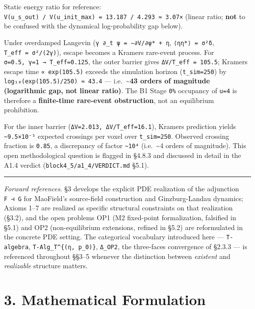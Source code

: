 \documentclass[
]{article}
\begin{document}
Static energy ratio for reference:
\texttt{V(u\_s\_out)\ /\ V(u\_init\_max)\ =\ 13.187\ /\ 4.293\ ≈\ 3.07×}
(linear ratio; \textbf{not} to be confused with the dynamical
log-probability gap below).

Under overdamped Langevin (\texttt{γ\ ∂\_t\ ψ\ =\ −∂V/∂ψ*\ +\ η},
\texttt{⟨ηη*⟩\ =\ σ²δ}, \texttt{T\_eff\ =\ σ²/(2γ)}), escape becomes a
Kramers rare-event process. For \texttt{σ=0.5,\ γ=1\ →\ T\_eff=0.125},
the outer barrier gives \texttt{ΔV/T\_eff\ =\ 105.5}; Kramers escape
time \texttt{∝\ exp(105.5)} exceeds the simulation horizon
(\texttt{t\_sim=250}) by \texttt{log₁₀(exp(105.5)/250)\ ≈\ 43.4} ---
i.e.~\textbf{\textasciitilde43 orders of magnitude (logarithmic gap, not
linear ratio)}. The B1 Stage \texttt{0\%} occupancy of \texttt{u=4} is
therefore a \textbf{finite-time rare-event obstruction}, not an
equilibrium prohibition.

For the inner barrier (\texttt{ΔV=2.013,\ ΔV/T\_eff=16.1}), Kramers
prediction yields \texttt{\textasciitilde{}9.5×10⁻⁵} expected crossings
per voxel over \texttt{t\_sim=250}. Observed crossing fraction is
\texttt{0.85}, a discrepancy of factor \texttt{\textasciitilde{}10⁴}
(i.e.~\textasciitilde4 orders of magnitude). This open methodological
question is flagged in §4.8.3 and discussed in detail in the A1.4
verdict (\texttt{block4\_5/a1\_4/VERDICT.md} §5.1).

\begin{center}\rule{0.5\linewidth}{0.5pt}\end{center}

\emph{Forward references}. §3 develops the explicit PDE realization of
the adjunction \texttt{F\ ⊣\ G} for MaoField's source-field construction
and Ginzburg-Landau dynamics; Axioms 1--7 are realized as specific
structural constraints on that realization (§3.2), and the open problems
OP1 (M2 fixed-point formalization, falsified in §5.1) and OP2
(non-equilibrium extensions, refined in §5.2) are reformulated in the
concrete PDE setting. The categorical vocabulary introduced here ---
\texttt{T-algebra}, \texttt{T-Alg\_T\^{}\{(η,\ p\_0)\}},
\texttt{Δ\_OP2}, the three-faces convergence of §2.3.3 --- is referenced
throughout §§3--5 whenever the distinction between \emph{existent} and
\emph{realizable} structure matters.

\hypertarget{mathematical-formulation}{%
\section{3. Mathematical Formulation}\label{mathematical-formulation}}
\end{document}
